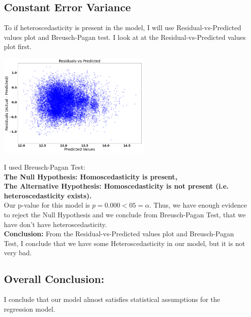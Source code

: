 \documentclass[10pt]{article}
\begin{document}
\subsection*{Constant Error Variance}
To if heteroscedasticity is present in the model, I will use Residual-vs-Predicted values plot and Breusch-Pagan test.
I look at at the Residual-vs-Predicted values plot first.
\begin{center}
	\includegraphics[width=3in]{residual_plot_multi_model}
\end{center}
I used Breusch-Pagan Test:\\
\textbf{The Null Hypothesis:  Homoscedasticity is present,\\
	The Alternative Hypothesis:  Homoscedasticity is not present (i.e. heteroscedasticity exists).}\\
Our p-value for this model is \(p=0.000 < 05 = \alpha\). Thus, we  have enough evidence to reject the Null Hypothesis and we conclude from Breusch-Pagan Test, that we have don't have heteroscedasticity.\\
\textbf{Conclusion:} From the Residual-vs-Predicted values plot and  Breusch-Pagan Test, I conclude that we  have some Heteroscedasticity in our model, but it is not very bad.
\subsection*{Overall Conclusion:} I conclude that our model almost satisfies statistical assumptions for the regression model.
\end{document}
